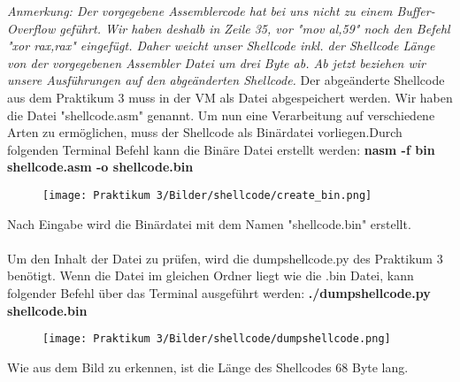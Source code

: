 \documentclass[12pt]{article}
\begin{document}
\textit{Anmerkung: Der vorgegebene Assemblercode hat bei uns nicht zu einem Buffer-Overflow geführt. Wir haben deshalb in Zeile 35, vor "mov al,59" noch den Befehl "xor rax,rax" eingefügt. Daher weicht unser Shellcode inkl. der Shellcode Länge von der vorgegebenen Assembler Datei um drei Byte ab. Ab jetzt beziehen wir unsere Ausführungen auf den abgeänderten Shellcode.}\newline
\newline
Der abgeänderte Shellcode aus dem Praktikum 3 muss in der VM als Datei abgespeichert werden. Wir haben die Datei "shellcode.asm" genannt.
Um nun eine Verarbeitung auf verschiedene Arten zu ermöglichen, muss der Shellcode als Binärdatei vorliegen.\newline Durch folgenden Terminal Befehl kann die Binäre Datei erstellt werden: \newline
\textbf{nasm -f bin shellcode.asm -o shellcode.bin} \newline
\begin{figure}[htbp]
    \centering
    \texttt{[image: Praktikum 3/Bilder/shellcode/create\_bin.png]}
\end{figure}
\newline
Nach Eingabe wird die Binärdatei mit dem Namen "shellcode.bin" erstellt.\\\\
Um den Inhalt der Datei zu prüfen, wird die dumpshellcode.py des Praktikum 3 \newline
benötigt. Wenn die Datei im gleichen Ordner liegt wie die .bin Datei, kann folgender \newline
Befehl über das Terminal ausgeführt werden: \newline
\textbf{./dumpshellcode.py shellcode.bin} \newline
\begin{figure}[htbp]
    \centering
    \texttt{[image: Praktikum 3/Bilder/shellcode/dumpshellcode.png]}
\end{figure}

Wie aus dem Bild zu erkennen, ist die Länge des Shellcodes 68 Byte lang.

\newpage
\end{document}
